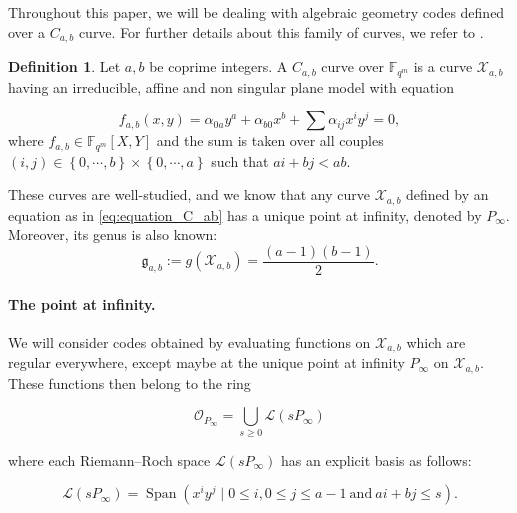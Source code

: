 \documentclass[a4paper]{article}
\theoremstyle{definition}
\newtheorem{definition}[thm]{Definition}
\theoremstyle{remark}
\newcommand{\calL}{\mathcal{L}}
\newcommand{\calX}{\mathcal{X}}
\newcommand{\fqm}{\mathbb{F}_{q^m}}
\newcommand{\set}[1]{\left\{#1\right\}}
\newcommand{\Span}[1]{\operatorname{Span}\left(#1\right)}
\begin{document}
Throughout this paper, we will be dealing with algebraic geometry codes defined over a $C_{a,b}$ curve. For further details about this family of curves, we refer to \cite{Miu93}. 



\begin{definition} \label{def:C_ab_curves} 
Let $a,b$ be coprime integers. A $C_{a,b}$ curve over $\fqm$ is a curve $\calX_{a,b}$ having an irreducible, affine and non singular plane model with equation

\begin{equation} \label{eq:equation_C_ab}
f_{a,b}(x,y) = \alpha_{0a}y^a + \alpha_{b0}x^b + \sum \alpha_{ij}x^iy^j = 0,
\end{equation}
where $f_{a,b} \in \fqm[X,Y]$ and the sum is taken over all couples $(i,j) \in \set{0,\cdots,b} \times \set{0,\cdots,a}$ such that $ai+bj < ab$.
\end{definition}

\noindent These curves are well-studied, and we know that any curve $\calX_{a,b}$ defined by an equation as in \eqref{eq:equation_C_ab} has a unique point at infinity, denoted by $P_{\infty}$. Moreover, its genus is also known:
\[\mathfrak{g}_{a,b}:=g(\calX_{a,b}) = \dfrac{(a-1)(b-1)}{2}.\]




\paragraph{The point at infinity.} We will consider codes obtained by evaluating functions on $\calX_{a,b}$ which are regular everywhere, except maybe at the unique point at infinity $P_\infty$ on $\calX_{a,b}$. These functions then belong to the ring 

\begin{equation}\label{eq:O_Pinf}
\mathcal{O}_{P_\infty}=\bigcup_{s \geq 0} \calL(s P_\infty)
\end{equation}

where each Riemann--Roch space $\calL(s P_\infty)$ has an explicit basis as follows:

\begin{equation} \label{eq:basis_L(sP_inf)}
    \calL(sP_{\infty}) = \Span{x^iy^j \mid 0 \leq i, 0\leq j\leq a-1 \ \mathrm{and} \ ai+bj \leq s}.
\end{equation}
\end{document}
